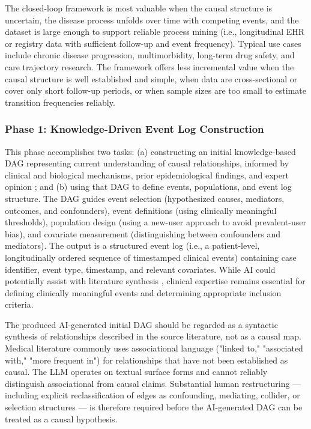 \documentclass[sn-vancouver-num]{sn-jnl}
\begin{document}
The closed-loop framework is most valuable when the causal structure is uncertain, the disease process unfolds over time with competing events, and the dataset is large enough to support reliable process mining (i.e., longitudinal EHR or registry data with sufficient follow-up and event frequency). Typical use cases include chronic disease progression, multimorbidity, long-term drug safety, and care trajectory research. The framework offers less incremental value when the causal structure is well established and simple, when data are cross-sectional or cover only short follow-up periods, or when sample sizes are too small to estimate transition frequencies reliably.

\subsubsection{Phase 1: Knowledge-Driven Event Log Construction}
This phase accomplishes two tasks: (a) constructing an initial knowledge-based DAG representing current understanding of causal relationships, informed by clinical and biological mechanisms, prior epidemiological findings, and expert opinion \citep{vanderweele2019,pearl2010,pearl2009,greenland1999,hernan2004}; and (b) using that DAG to define events, populations, and event log structure. The DAG guides event selection (hypothesized causes, mediators, outcomes, and confounders), event definitions (using clinically meaningful thresholds), population design (using a new-user approach to avoid prevalent-user bias), and covariate measurement (distinguishing between confounders and mediators). The output is a structured event log (i.e., a patient-level, longitudinally ordered sequence of timestamped clinical events) containing case identifier, event type, timestamp, and relevant covariates. While AI could potentially assist with literature synthesis \citep{wang2024,thirunavukarasu2023}, clinical expertise remains essential for defining clinically meaningful events and determining appropriate inclusion criteria.

The produced AI-generated initial DAG should be regarded as a syntactic synthesis of relationships described in the source literature, not as a causal map. Medical literature commonly uses associational language ("linked to," "associated with," "more frequent in") for relationships that have not been established as causal. The LLM operates on textual surface forms and cannot reliably distinguish associational from causal claims. Substantial human restructuring — including explicit reclassification of edges as confounding, mediating, collider, or selection structures — is therefore required before the AI-generated DAG can be treated as a causal hypothesis.
\end{document}
